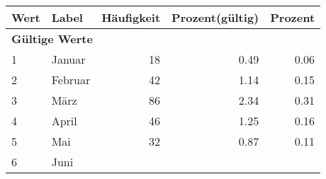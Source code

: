      \begin{longtable}{lXrrr}
     \toprule
     \textbf{Wert} & \textbf{Label} & \textbf{Häufigkeit} & \textbf{Prozent(gültig)} & \textbf{Prozent} \\
     \endhead
     \midrule
     \multicolumn{5}{l}{\textbf{Gültige Werte}}\\

     1 &
     \multicolumn{1}{X}{ Januar   } &


       \num{18} &
       \num[round-mode=places,round-precision=2]{0,49} &
         \num[round-mode=places,round-precision=2]{0,06} \\

     2 &
     \multicolumn{1}{X}{ Februar   } &


       \num{42} &
       \num[round-mode=places,round-precision=2]{1,14} &
         \num[round-mode=places,round-precision=2]{0,15} \\

     3 &
     \multicolumn{1}{X}{ März   } &


       \num{86} &
       \num[round-mode=places,round-precision=2]{2,34} &
         \num[round-mode=places,round-precision=2]{0,31} \\

     4 &
     \multicolumn{1}{X}{ April   } &


       \num{46} &
       \num[round-mode=places,round-precision=2]{1,25} &
         \num[round-mode=places,round-precision=2]{0,16} \\

     5 &
     \multicolumn{1}{X}{ Mai   } &


       \num{32} &
       \num[round-mode=places,round-precision=2]{0,87} &
         \num[round-mode=places,round-precision=2]{0,11} \\

     6 &
     \multicolumn{1}{X}{ Juni   } &



\end{longtable}
